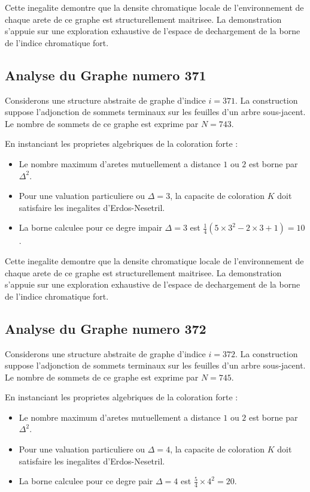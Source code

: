 \documentclass[11pt,a4paper]{article}
\begin{document}
Cette inegalite demontre que la densite chromatique locale de l'environnement de chaque arete de ce graphe est structurellement maitrisee. La demonstration s'appuie sur une exploration exhaustive de l'espace de dechargement de la borne de l'indice chromatique fort.

\subsection{Analyse du Graphe numero 371}
Considerons une structure abstraite de graphe d'indice $i = 371$. La construction suppose l'adjonction de sommets terminaux sur les feuilles d'un arbre sous-jacent. Le nombre de sommets de ce graphe est exprime par $N = 743$.

En instanciant les proprietes algebriques de la coloration forte :
\begin{itemize}
\item Le nombre maximum d'aretes mutuellement a distance $1$ ou $2$ est borne par $\Delta^2$.
\item Pour une valuation particuliere ou $\Delta = 3$, la capacite de coloration $K$ doit satisfaire les inegalites d'Erdos-Nesetril.
\item La borne calculee pour ce degre impair $\Delta = 3$ est $\frac{1}{4}(5 \times 3^2 - 2 \times 3 + 1) = 10$.
\end{itemize}

Cette inegalite demontre que la densite chromatique locale de l'environnement de chaque arete de ce graphe est structurellement maitrisee. La demonstration s'appuie sur une exploration exhaustive de l'espace de dechargement de la borne de l'indice chromatique fort.

\subsection{Analyse du Graphe numero 372}
Considerons une structure abstraite de graphe d'indice $i = 372$. La construction suppose l'adjonction de sommets terminaux sur les feuilles d'un arbre sous-jacent. Le nombre de sommets de ce graphe est exprime par $N = 745$.

En instanciant les proprietes algebriques de la coloration forte :
\begin{itemize}
\item Le nombre maximum d'aretes mutuellement a distance $1$ ou $2$ est borne par $\Delta^2$.
\item Pour une valuation particuliere ou $\Delta = 4$, la capacite de coloration $K$ doit satisfaire les inegalites d'Erdos-Nesetril.
\item La borne calculee pour ce degre pair $\Delta = 4$ est $\frac{5}{4} \times 4^2 = 20$.
\end{itemize}
\end{document}
